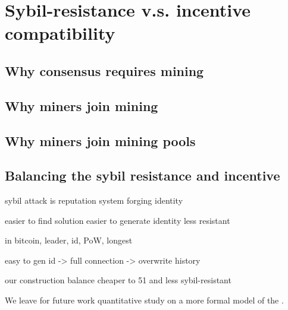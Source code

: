 \section{Sybil-resistance v.s. incentive compatibility}

\subsection{Why consensus requires mining}



\subsection{Why miners join mining}




\subsection{Why miners join mining pools}



\subsection{Balancing the sybil resistance and incentive}



sybil attack is 
reputation system
forging identity

easier to find solution
easier to generate identity
less resistant

in bitcoin, leader, id, PoW, longest

easy to gen id -> full connection -> overwrite history


our construction
balance
cheaper to 51 and less sybil-resistant


We leave for future work quantitative study on a more formal model of the .